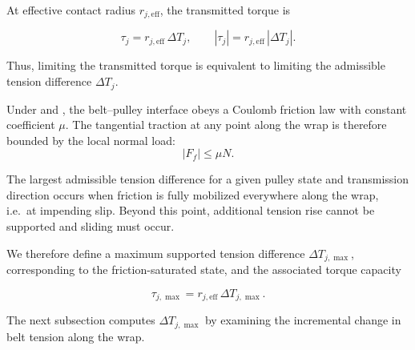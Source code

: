 \documentclass[11pt]{article}
\numberwithin{equation}{section}
\newcounter{assump}
\begin{document}
At effective contact radius \(r_{j,\mathrm{eff}}\), the transmitted torque is

\begin{equation}
\tau_j
=
r_{j,\mathrm{eff}}\,\Delta T_j,
\qquad
|\tau_j|
=
r_{j,\mathrm{eff}}\,|\Delta T_j|.
\label{eq:tau_from_deltaT}
\end{equation}

Thus, limiting the transmitted torque is equivalent to limiting
the admissible tension difference \(\Delta T_j\).


Under  and
,
the belt--pulley interface obeys a Coulomb friction law with constant
coefficient \(\mu\).
The tangential traction at any point along the wrap
is therefore bounded by the local normal load:
\[
|F_f| \le \mu N.
\]

The largest admissible tension difference for a given pulley state and
transmission direction occurs when friction is fully mobilized everywhere
along the wrap, i.e.\ at impending slip.
Beyond this point, additional tension rise cannot be supported and
sliding must occur.

We therefore define a maximum supported tension difference
\(\Delta T_{j,\max}\), corresponding to the friction-saturated state,
and the associated torque capacity

\begin{equation}
\tau_{j,\max}
=
r_{j,\mathrm{eff}}\,\Delta T_{j,\max}.
\label{eq:tau_max_def}
\end{equation}

The next subsection computes \(\Delta T_{j,\max}\) by examining the
incremental change in belt tension along the wrap.
\end{document}
